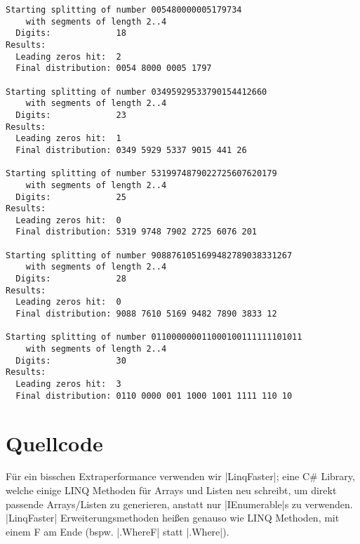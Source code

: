\documentclass[a4paper,10pt,ngerman]{scrartcl}
\begin{document}
\begin{lstlisting}
Starting splitting of number 005480000005179734
    with segments of length 2..4
  Digits:             18
Results:
  Leading zeros hit:  2
  Final distribution: 0054 8000 0005 1797

Starting splitting of number 03495929533790154412660
    with segments of length 2..4
  Digits:             23
Results:
  Leading zeros hit:  1
  Final distribution: 0349 5929 5337 9015 441 26

Starting splitting of number 5319974879022725607620179
    with segments of length 2..4
  Digits:             25
Results:
  Leading zeros hit:  0
  Final distribution: 5319 9748 7902 2725 6076 201

Starting splitting of number 9088761051699482789038331267
    with segments of length 2..4
  Digits:             28
Results:
  Leading zeros hit:  0
  Final distribution: 9088 7610 5169 9482 7890 3833 12

Starting splitting of number 011000000011000100111111101011
    with segments of length 2..4
  Digits:             30
Results:
  Leading zeros hit:  3
  Final distribution: 0110 0000 001 1000 1001 1111 110 10
\end{lstlisting}

\section{Quellcode}

Für ein bisschen Extraperformance verwenden wir |LinqFaster|; eine C\# Library, welche einige LINQ Methoden für Arrays und Listen neu schreibt, um direkt passende Arrays/Listen zu generieren, anstatt nur |IEnumerable|s zu verwenden.
|LinqFaster| Erweiterungsmethoden heißen genauso wie LINQ Methoden, mit einem F am Ende (bspw. |.WhereF| statt |.Where|).
\end{document}
